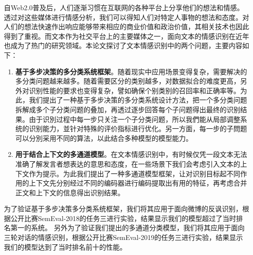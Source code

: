 \begin{cabstract}

自Web2.0普及后，人们逐渐习惯在互联网的各种平台上分享他们的想法和情感。透过对这些媒体进行情感分析，我们可以得知人们对特定人事物的想法和态度。对人们的想法快速作出响应能够带来相应的商业价值和政治价值，其相关技术也因此得到了重视。而文本作为社交平台上的主要媒体之一，面向文本的情感识别在近年也成为了热门的研究领域。本论文探讨了文本情感识别中的两个问题，主要内容如下：

\begin{enumerate}

\item {\bf 基于多步决策的多分类系统框架}。随着现实中应用场景变得复杂，需要解决的多分类问题越来越多。随着需要区分的类别越多，对数据拟合的难度更高，另外对识别性能的要求也变得复杂，譬如确保个别类别的召回率和正确率等。为此，我们提出了一种基于多步决策的多分类系统设计方法，把一个多分类问题拆解成多个子分类问题的叠加，再透过逐步回答每个子问题得出最终的识别结果。由于识別过程中每一步只关注一个子分类问题，所以我們能从局部调整系统的识别能力，並针对特殊的评价指标进行优化。另一方面，每一步的子問题可以分別采用不同的算法，以此结合多种模型的模型能力。


\item {\bf 用于结合上下文的多通道模型}。在文本情感识别中，有时候仅凭一段文本无法准确了解发言者想表达的意思和态度，在一些场景下我们会考虑引入文本的上下文作为提示。为此我们提出了一种多通道模型框架，让对识别目标起不同作用的上下文先分别经过不同的编码器进行编码提取出有用的特征，再考虑合并正文和上下文的信息得出识别结果。

\end{enumerate}

为了验证基于多步决策多分类系统框架，我们将其应用于面向微博的反讽识别，根据公开比赛SemEval-2018的任务三进行实验，结果显示我们的模型超过了当时排名第一的系统。
另外为了验证我们提出的多通道分类模型，我们将其应用于面向三轮对话的情感识别，根据公开比赛SemEval-2019的任务三进行实验，结果显示我们的模型达到了当时排名前十的性能。


\end{cabstract}


